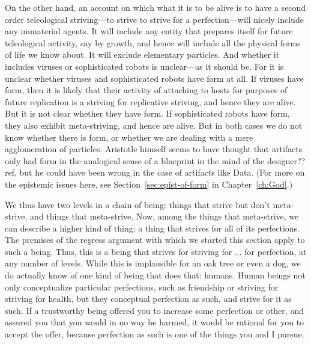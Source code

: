 On the other hand, an account on which what it is to be alive is to have a second order teleological striving---to strive to strive for a perfection---will nicely
include any immaterial agents. It will include any entity that prepares itself for future teleological activity, say by growth,
and hence will include all the physical forms of life we know about. It will exclude elementary particles. And whether it includes viruses or sophisticated
robots is unclear---as it should be. For it is unclear whether viruses and sophisticated robots have form at all. If viruses have form, then it is likely
that their activity of attaching to hosts for purposes of future replication is a striving for replicative striving, and hence they are alive. But it is
not clear whether they have form. If sophisticated robots have form, they also exhibit meta-striving, and hence are alive. But in both cases we do not
know whether there is form, or whether we are dealing with a mere agglomeration of particles.
Aristotle himself seems to have thought that
artifacts only had form in the analogical sense of a blueprint in the mind of the designer??ref, but he could have been wrong in the case of artifacts like Data.
(For more on the epistemic issues here, see Section~\ref{sec:epist-of-form}
in Chapter~\ref{ch:God}.)

We thus have two levels in a chain of being: things that strive but don't meta-strive, and things that meta-strive. Now, among the things that meta-strive,
we can describe a higher kind of thing: a thing that strives for all of its perfections. The premises of the regress argument with which we started this
section apply to such a being. Thus, this is a being that strives for striving for ... for perfection, at any number of levels. While this is implausible
for an oak tree or even a dog, we do actually know of one kind of being that does that: humans. Human beings not only conceptualize particular perfections, such as friendship
or striving for striving for health, but they conceptual perfection as such, and strive for it as such. If a trustworthy being offered you to increase
some perfection or other, and assured you that you would in no way be harmed, it would be rational for you to accept the offer, because perfection as
such is one of the things you and I pursue.

